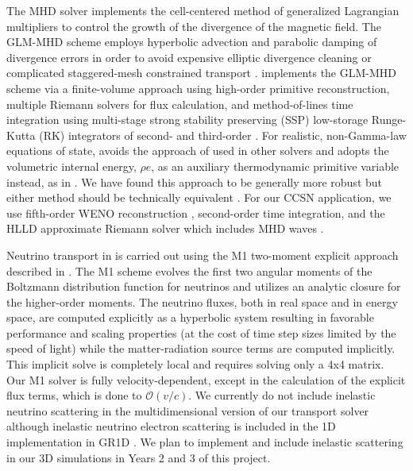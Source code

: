 The \spark MHD solver \citep{Couch:2017} implements the cell-centered method of generalized Lagrangian multipliers \citep[GLM;][]{Dedner:2002, Mignone:2010} to control the growth of the divergence of the magnetic field.
The GLM-MHD scheme employs hyperbolic advection and parabolic damping of divergence errors in order to avoid expensive elliptic divergence cleaning \citep[e.g.,][]{Jiang:1999} or complicated staggered-mesh constrained transport \citep[e.g.,][]{Gardiner:2005, Lee:2009a, Lee:2013}.
\spark implements the GLM-MHD scheme via a finite-volume approach using high-order primitive reconstruction, multiple Riemann solvers for flux calculation, and method-of-lines time integration using multi-stage strong stability preserving (SSP) low-storage Runge-Kutta (RK) integrators of second- and third-order \citep[e.g.,][]{Gottlieb:1998}.
For realistic, non-Gamma-law equations of state, \spark avoids the approach of \citet{Colella:1985} used in other \flash solvers and adopts the volumetric internal energy, $\rho e$, as an auxiliary thermodynamic primitive variable instead, as in \citet{Almgren:2010}.
We have found this approach to be generally more robust but either method should be technically equivalent \citep[e.g.,][]{Zingale:2015}.
For our CCSN application, we use fifth-order WENO reconstruction \citep{Borges:2008}, second-order time integration, and the HLLD approximate Riemann solver which includes MHD waves \citep{Miyoshi:2005}.

Neutrino transport in \sparkmone is carried out using the M1 two-moment explicit approach described in \citet{OConnor:2015, OConnor:2015a, OConnor:2017a}.
The M1 scheme evolves the first two angular moments of the Boltzmann distribution function for neutrinos and utilizes an analytic closure for the higher-order moments.
The neutrino fluxes, both in real space and in energy space, are computed explicitly as a hyperbolic system resulting in favorable performance and scaling properties (at the cost of time step sizes limited by the speed of light) while the matter-radiation source terms are computed implicitly.
This implicit solve is completely local and requires solving only a 4x4 matrix.
Our M1 solver is fully velocity-dependent, except in the calculation of the explicit flux terms, which is done to $\mathcal{O}(v/c)$.
We currently do not include inelastic neutrino scattering in the multidimensional version of our transport solver although inelastic neutrino electron scattering is included in the 1D implementation in GR1D \citep{OConnor:2015}.
We plan to implement and include inelastic scattering in our 3D simulations in Years 2 and 3 of this project.

